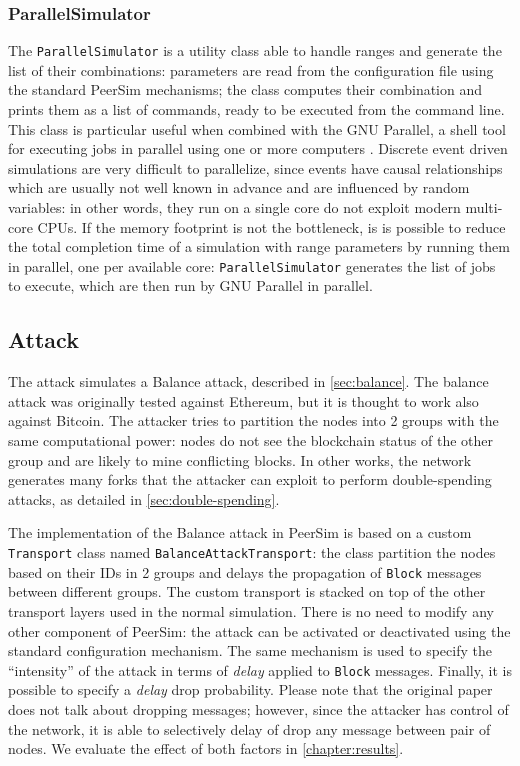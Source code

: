 \subsubsection{ParallelSimulator}
The \texttt{ParallelSimulator} is a utility class able to handle ranges and generate the list of their combinations:
parameters are read from the configuration file using the standard PeerSim mechanisms;
the class computes their combination and prints them as a list of commands, ready to be executed from the command line.
This class is particular useful when combined with the GNU Parallel, a shell tool for executing jobs in parallel using one or more computers \cite{gnu_parallel}.
Discrete event driven simulations are very difficult to parallelize, since events have causal relationships which are usually not well known in advance and are influenced by random variables:
in other words, they run on a single core do not exploit modern multi-core \ac{CPU}s.
If the memory footprint is not the bottleneck, is is possible to reduce the total completion time of a simulation with range parameters by running them in parallel, one per available core:
\texttt{ParallelSimulator} generates the list of jobs to execute, which are then run by GNU Parallel in parallel.

\subsection{Attack}
The attack simulates a Balance attack, described in \cref{sec:balance}.
The balance attack was originally tested against Ethereum, but it is thought to work also against Bitcoin.
The attacker tries to partition the nodes into \num{2} groups with the same computational power:
nodes do not see the blockchain status of the other group and are likely to mine conflicting blocks.
In other works, the network generates many forks that the attacker can exploit to perform double-spending attacks, as detailed in \cref{sec:double-spending}.

\bigskip
The implementation of the Balance attack in PeerSim is based on a custom \texttt{Transport} class named \texttt{BalanceAttackTransport}:
the class partition the nodes based on their IDs in \num{2} groups and delays the propagation of \texttt{Block} messages between different groups.
The custom transport is stacked on top of the other transport layers used in the normal simulation.
There is no need to modify any other component of PeerSim:
the attack can be activated or deactivated using the standard configuration mechanism.
The same mechanism is used to specify the ``intensity'' of the attack in terms of \textit{delay} applied to \texttt{Block} messages.
Finally, it is possible to specify a \textit{delay} drop probability.
Please note that the original paper \cite{balance_attack_2017} does not talk about dropping messages;
however, since the attacker has control of the network, it is able to selectively delay of drop any message between pair of nodes.
We evaluate the effect of both factors in \cref{chapter:results}.
